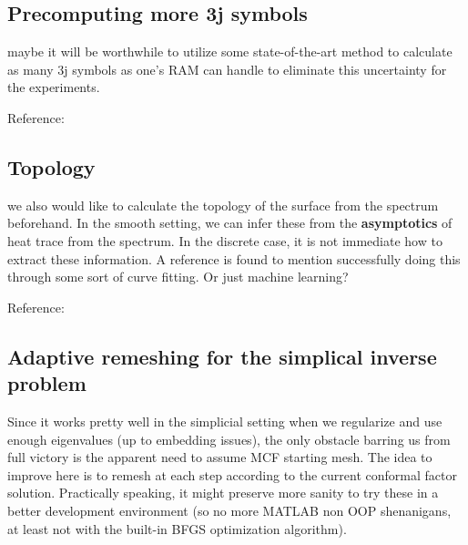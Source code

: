 \documentclass[11pt]{article}
\theoremstyle{definition}
\begin{document}
\subsection{Precomputing more 3j symbols}
maybe it will be worthwhile to utilize some state-of-the-art method to calculate as many 3j symbols as one's RAM can handle to eliminate this uncertainty for the experiments.

Reference: 

\subsection{Topology}
we also would like to calculate the topology of the surface from the spectrum beforehand. In the smooth setting, we can infer these from the \textbf{asymptotics} of heat trace from the spectrum. In the discrete case, it is not immediate how to extract these information. A reference is found to mention successfully doing this through some sort of curve fitting. Or just machine learning?

Reference: 

\subsection{Adaptive remeshing for the simplical inverse problem}
Since it works pretty well in the simplicial setting when we regularize and use enough eigenvalues (up to embedding issues), the only obstacle barring us from full victory is the apparent need to assume MCF starting mesh. The idea to improve here is to remesh at each step according to the current conformal factor solution. Practically speaking, it might preserve more sanity to try these in a better development environment (so no more MATLAB non OOP shenanigans, at least not with the built-in BFGS optimization algorithm).
\end{document}
